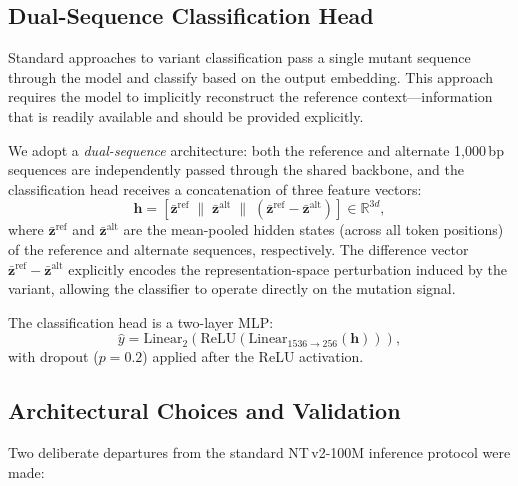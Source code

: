 \documentclass[journal]{IEEEtran}
\newcommand{\ntv}{NT\,v2-100M}
\begin{document}
\subsection{Dual-Sequence Classification Head}

Standard approaches to variant classification pass a single
mutant sequence through the model and classify based on the
output embedding.
This approach requires the model to implicitly reconstruct the
reference context---information that is readily available and
should be provided explicitly.

We adopt a \emph{dual-sequence} architecture: both the reference
and alternate 1,000\,bp sequences are independently passed through
the shared backbone, and the classification head receives
a concatenation of three feature vectors:
\begin{equation}
  \mathbf{h} = \left[
    \bar{\mathbf{z}}^{\text{ref}} \;\|\;
    \bar{\mathbf{z}}^{\text{alt}} \;\|\;
    \left(\bar{\mathbf{z}}^{\text{ref}} - \bar{\mathbf{z}}^{\text{alt}}\right)
  \right] \in \mathbb{R}^{3d},
  \label{eq:dual_seq}
\end{equation}
where $\bar{\mathbf{z}}^{\text{ref}}$ and
$\bar{\mathbf{z}}^{\text{alt}}$ are the mean-pooled hidden states
(across all token positions) of the reference and alternate
sequences, respectively.
The difference vector
$\bar{\mathbf{z}}^{\text{ref}} - \bar{\mathbf{z}}^{\text{alt}}$
explicitly encodes the representation-space perturbation induced
by the variant, allowing the classifier to operate directly on
the mutation signal.

The classification head is a two-layer MLP:
\begin{equation}
  \hat{y} = \text{Linear}_{2}\!\left(
    \text{ReLU}\!\left(
      \text{Linear}_{1536 \to 256}(\mathbf{h})
    \right)
  \right),
  \label{eq:classifier}
\end{equation}
with dropout ($p = 0.2$) applied after the ReLU activation.

\subsection{Architectural Choices and Validation}

Two deliberate departures from the standard \ntv{} inference
protocol were made:
\end{document}

